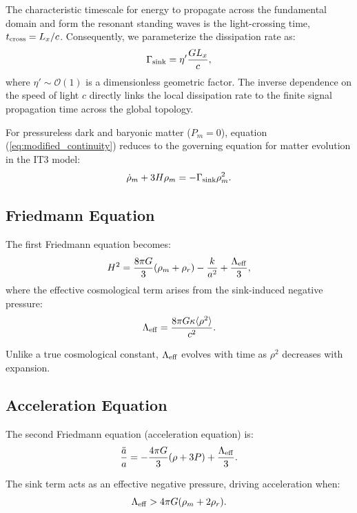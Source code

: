 \documentclass[12pt,a4paper]{article}
\begin{document}
The characteristic timescale for energy to propagate across the fundamental domain and form the resonant standing waves is the light-crossing time, $t_{\rm cross} = L_x/c$. Consequently, we parameterize the dissipation rate as:
\begin{equation}
\Gamma_{\rm sink} = \eta' \frac{G L_x}{c},
\label{eq:gamma_sink}
\end{equation}
where $\eta' \sim \mathcal{O}(1)$ is a dimensionless geometric factor. The inverse dependence on the speed of light $c$ directly links the local dissipation rate to the finite signal propagation time across the global topology.

For pressureless dark and baryonic matter ($P_m = 0$), equation (\ref{eq:modified_continuity}) reduces to the governing equation for matter evolution in the IT3 model:
\begin{equation}
\dot{\rho}_m + 3H\rho_m = -\Gamma_{\rm sink} \rho_m^2.
\label{eq:matter_cont}
\end{equation}

\subsection{Friedmann Equation}

The first Friedmann equation becomes:
\begin{equation}
H^2 = \frac{8\pi G}{3}(\rho_m + \rho_r) - \frac{k}{a^2} + \frac{\Lambda_{\rm eff}}{3},
\end{equation}
where the effective cosmological term arises from the sink-induced negative pressure:
\begin{equation}
\Lambda_{\rm eff} = \frac{8\pi G \kappa \langle \rho^2 \rangle}{c^2}.
\end{equation}

Unlike a true cosmological constant, $\Lambda_{\rm eff}$ evolves with time as $\rho^2$ decreases with expansion.

\subsection{Acceleration Equation}

The second Friedmann equation (acceleration equation) is:
\begin{equation}
\frac{\ddot{a}}{a} = -\frac{4\pi G}{3}(\rho + 3P) + \frac{\Lambda_{\rm eff}}{3}.
\end{equation}

The sink term acts as an effective negative pressure, driving acceleration when:
\begin{equation}
\Lambda_{\rm eff} > 4\pi G (\rho_m + 2\rho_r).
\end{equation}
\end{document}

